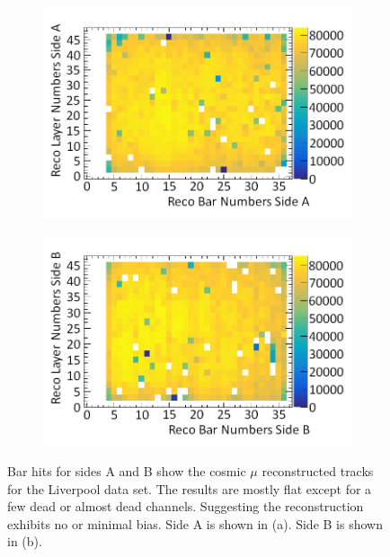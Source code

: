\begin{figure}[!h]
\centering
\begin{subfigure}{.5\textwidth}
  \centering
  \includegraphics[width=\linewidth]{Chapter6/Figs/Raster/liverpoolSideAHitsMedText.png}
  \captionsetup{width=.9\linewidth}
  \caption{}
  \label{subFig:liverpoolSideAHits}
\end{subfigure}%
\begin{subfigure}{.5\textwidth}
  \centering
\includegraphics[width=\linewidth]{Chapter6/Figs/Raster/liverpoolSideBHitsMedText.png}
  \captionsetup{width=.9\linewidth}
  \caption{}
  \label{subFig:liverpoolSideBHits}
\end{subfigure}
\caption{Bar hits for sides A and B show the cosmic $\mu$ reconstructed tracks for the Liverpool data set. The results are mostly flat except for a few dead or almost dead channels. Suggesting the reconstruction exhibits no or minimal bias. Side A is shown in (a). Side B is shown in (b).}
\label{fig:liverpoolSideABHits}
\end{figure}

